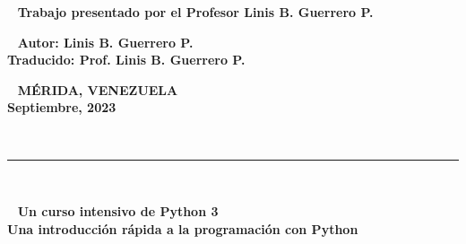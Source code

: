 \begin{center}
	{\ {\bf \vspace{0.2cm}  Trabajo presentado por el Profesor Linis B. Guerrero P.\\ 
			\vspace{0.2cm} 	
	}}
\end{center}




\begin{center}
	{\ {\bf \vspace{0.2cm}  		Autor: Linis B. Guerrero P.\\
			Traducido: Prof. Linis B. Guerrero P.\\
			\vspace{0.2cm} 	
	}}
\end{center}


\begin{center}
	{\ {\bf \vspace{0.2cm}  	MÉRIDA, VENEZUELA \\
			Septiembre, 2023 \\
			\vspace{0.2cm} 
	}}
\end{center}



\thispagestyle{empty}~~\vspace{-0.2cm}
















\vskip 5cm \rule{\linewidth}{1.3pt}\\%
\begin{center}
	{\  \LARGE  {\bf \vspace{0.2cm}  Un curso intensivo de Python 3   \\				 
			\vspace{0.2cm} Una introducción rápida a la programación con Python \\ }}						
\end{center}		


